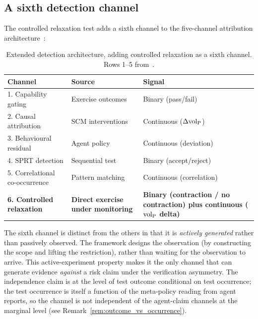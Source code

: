 \subsection{A sixth detection channel}

\begin{lemma}
\label{lem:sixth_channel}
The controlled relaxation test adds a sixth channel to the
five-channel attribution
architecture~\citep[Table~1]{lasser2026scm}:
\begin{table}[h]
\centering
\small
\begin{tabular}{@{}p{4.0cm}p{4.2cm}p{4.2cm}@{}}
\toprule
\textbf{Channel} & \textbf{Source} & \textbf{Signal} \\
\midrule
1. Capability gating
  & Exercise outcomes
  & Binary (pass/fail) \\
2. Causal attribution
  & SCM interventions
  & Continuous ($\Delta {\operatorname{vol}_{\mathrm{P}}}$) \\
3. Behavioural residual
  & Agent policy
  & Continuous (deviation) \\
4. SPRT detection
  & Sequential test
  & Binary (accept/reject) \\
5. Correlational co-occurrence
  & Pattern matching
  & Continuous (correlation) \\
\textbf{6. Controlled relaxation}
  & \textbf{Direct exercise under monitoring}
  & \textbf{Binary (contraction / no contraction) plus
    continuous (${\operatorname{vol}_{\mathrm{P}}}$ delta)} \\
\bottomrule
\end{tabular}
\caption{Extended detection architecture, adding controlled
  relaxation as a sixth channel.  Rows 1--5
  from~\citep[Table~1]{lasser2026scm}.}
\label{tab:sixth_channel}
\end{table}

\noindent The sixth channel is distinct from the others in that
it is \emph{actively generated} rather than passively observed.
The framework designs the observation (by constructing the
scope and lifting the restriction), rather than waiting for the
observation to arrive.  This active-experiment property makes
it the only channel that can generate evidence \emph{against} a
risk claim under the verification asymmetry.  The independence
claim is at the level of test outcome conditional on test
occurrence; the test occurrence is itself a function of the
meta-policy reading from agent reports, so the channel is not
independent of the agent-claim channels at the marginal level
(see Remark~\ref{rem:outcome_vs_occurrence}).
\end{lemma}

